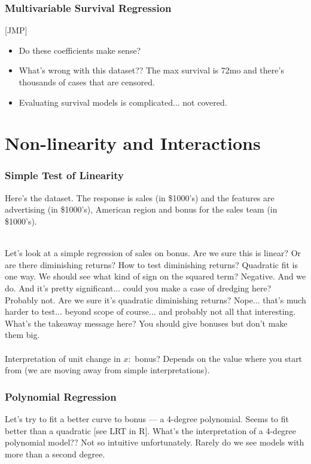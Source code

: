 \documentclass[handout]{beamer}
\begin{document}
\begin{frame}\frametitle{Multivariable Survival Regression}

[JMP] 
\begin{itemize}
\item Do these coefficients make sense? \pause 
\item What's wrong with this dataset?? \pause The max survival is 72mo and there's thousands of cases that are censored. \pause
\item Evaluating survival models is complicated... not covered.
\end{itemize}	
\end{frame}

\section{Non-linearity and Interactions}

\begin{frame}\frametitle{Simple Test of Linearity}

Here's the  dataset. The response is sales (in \$1000's) and the features are advertising (in \$1000's), American region and bonus for the sales team (in \$1000's). \\~\\ \pause

Let's look at a simple regression of sales on bonus. \pause Are we sure this is linear? Or are there diminishing returns? How to test diminishing returns? \pause Quadratic fit is one way. We should see what kind of sign on the squared term? \pause Negative. And we do. And it's pretty significant... could you make a case of dredging here? \pause Probably not. Are we sure it's quadratic diminishing returns? \pause Nope... that's much harder to test... beyond scope of course... and probably not all that interesting. \pause What's the takeaway message here? \pause You should give bonuses but don't make them  big. \\~\\

\small
Interpretation of unit change in $x:$ bonus? Depends on the value where you start from (we are moving away from simple interpretations).
	
\end{frame}


\begin{frame}\frametitle{Polynomial Regression}

Let's try to fit a better curve to bonus --- a 4-degree polynomial. Seems to fit better than a quadratic [see LRT in R]. What's the interpretation of a 4-degree polynomial model?? \pause Not so intuitive unfortunately. Rarely do we see models with more than a second degree.

\end{frame}
\end{document}
